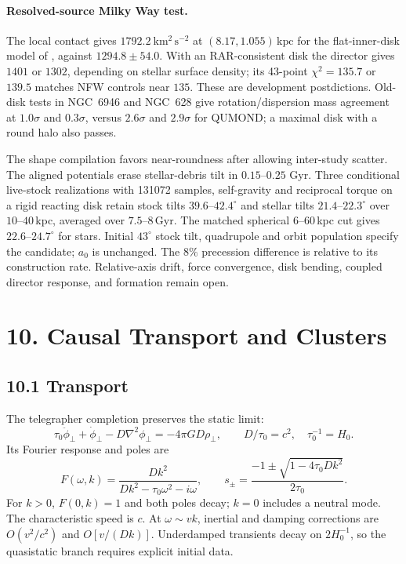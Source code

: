 \documentclass[11pt]{article}
\begin{document}
\paragraph{Resolved-source Milky Way test.}
The local contact gives $1792.2\ \mathrm{km^2\,s^{-2}}$ at $(8.17,1.055)\,\mathrm{kpc}$ for the flat-inner-disk model of \citet{Wang2026MW}, against $1294.8\pm54.0$. With an RAR-consistent disk the director gives $1401$ or $1302$, depending on stellar surface density; its 43-point $\chi^2=135.7$ or $139.5$ matches NFW controls near $135$. These are development postdictions. Old-disk tests in NGC~6946 and NGC~628 \citep{Aniyan2021,Aniyan2018} give rotation/dispersion mass agreement at $1.0\sigma$ and $0.3\sigma$, versus $2.6\sigma$ and $2.9\sigma$ for QUMOND; a maximal disk with a round halo also passes.

The shape compilation favors near-roundness after allowing inter-study scatter. The aligned potentials erase stellar-debris tilt \citep{DillamoreSanders2025} in $0.15$--$0.25$ Gyr. Three conditional live-stock realizations with 131072 samples, self-gravity and reciprocal torque on a rigid reacting disk retain stock tilts $39.6$--$42.4^\circ$ and stellar tilts $21.4$--$22.3^\circ$ over $10$--$40\,$kpc, averaged over $7.5$--$8\,$Gyr. The matched spherical $6$--$60\,$kpc cut gives $22.6$--$24.7^\circ$ for stars. Initial $43^\circ$ stock tilt, quadrupole and orbit population specify the candidate; $a_0$ is unchanged. The $8\%$ precession difference is relative to its construction rate. Relative-axis drift, force convergence, disk bending, coupled director response, and formation remain open.

\section{10. Causal Transport and Clusters}

\subsection{10.1 Transport}

The telegrapher completion preserves the static limit:
\[
\tau_0\ddot\phi_\perp+\dot\phi_\perp-D\nabla^2\phi_\perp=-4\pi GD\rho_\perp,
\qquad D/\tau_0=c^2,\quad\tau_0^{-1}=H_0.
\]
Its Fourier response and poles are
\[
F(\omega,k)=\frac{Dk^2}{Dk^2-\tau_0\omega^2-i\omega},\qquad
s_\pm=\frac{-1\pm\sqrt{1-4\tau_0Dk^2}}{2\tau_0}.
\]
For $k>0$, $F(0,k)=1$ and both poles decay; $k=0$ includes a neutral mode. The characteristic speed is $c$. At $\omega\sim vk$, inertial and damping corrections are $O(v^2/c^2)$ and $O[v/(Dk)]$. Underdamped transients decay on $2H_0^{-1}$, so the quasistatic branch requires explicit initial data.
\end{document}
